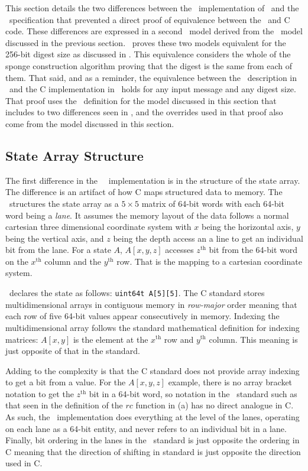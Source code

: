 This section details the two differences between the \openssl\ implementation of \shaThree\ and the \fips\ specification that prevented a direct proof of equivalence between the \cryptol\ and C code.
These differences are expressed in a second \cryptol\ model derived from the \fips\ model discussed in the previous section.
\saw\ proves these two models equivalent for the 256-bit digest size as discussed in .
This equivalence considers the whole of the sponge construction algorithm proving that the digest is the same from each of them.
That said, and as a reminder, the equivalence between the \keccak\ description in \cryptol\ and the C implementation in \openssl\ holds for any input message and any digest size.
That proof uses the \cryptol\ definition for the model discussed in this section that includes to two differences seen in \openssl, and the overrides used in that proof also come from the model discussed in this section.

\subsection{State Array Structure}

The first difference in the \openssl\ \shaThree\ implementation is in the structure of the state array.
The difference is an artifact of how C maps structured data to memory.
The \fips\ structures the state array as a $5 \times 5$ matrix of 64-bit words with each 64-bit word being a \emph{lane}.
It assumes the memory layout of the data follows a normal cartesian three dimensional coordinate system with $x$ being the horizontal axis, $y$ being the vertical axis, and $z$ being the depth access an a line to get an individual bit from the lane.
For a state $A$, $A[x,y,z]$ accesses $z^\mathrm{th}$ bit from the 64-bit word on the $x^\mathrm{th}$ column and the $y^\mathrm{th}$ row.
That is the mapping to a cartesian coordinate system.

\openssl\ declares the state as follows: \texttt{uint64\textunderscore t A[5][5]}.
The C standard stores multidimensional arrays in contiguous memory in \emph{row-major} order meaning that each row of five 64-bit values appear consecutively in memory.
Indexing the multidimensional array follows the standard mathematical definition for indexing matrices: $A[x,y]$ is the element at the $x^\mathrm{th}$ row and $y^\mathrm{th}$ column.
This meaning is just opposite of that in the standard.

Adding to the complexity is that the C standard does not provide array indexing to get a bit from a value.
For the $A[x,y,z]$ example, there is no array bracket notation to get the $z^\mathrm{th}$ bit in a 64-bit word, so notation in the \fips\ standard such as that seen in the definition of the $rc$ function in (a) has no direct analogue in C.
As such, the \openssl\ implementation does everything at the level of the lanes, operating on each lane as a 64-bit entity, and never refers to an individual bit in a lane.
Finally, bit ordering in the lanes in the \fips\ standard is just opposite the ordering in C meaning that the direction of shifting in standard is just opposite the direction used in C.

